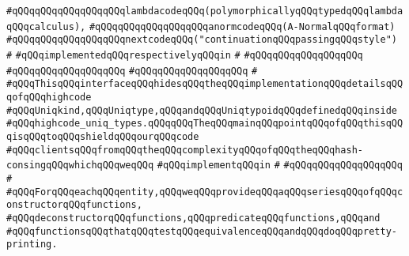 \verb|#qQQqqQQqqQQqqQQqqQQqlambdacodeqQQq(polymorphicallyqQQqtypedqQQqlambdaqQQqcalculus),|\newline
\verb|#qQQqqQQqqQQqqQQqqQQqanormcodeqQQq(A-NormalqQQqformat)|\newline
\verb|#qQQqqQQqqQQqqQQqqQQqnextcodeqQQq("continuationqQQqpassingqQQqstyle")|\newline
\verb|#|\newline
\verb|#qQQqimplementedqQQqrespectivelyqQQqin|\newline
\verb|#|\newline
\verb|#qQQqqQQqqQQqqQQqqQQq|\newline
\verb|#qQQqqQQqqQQqqQQqqQQq|\newline
\verb|#qQQqqQQqqQQqqQQqqQQq|\newline
\verb|#|\newline
\verb|#qQQqThisqQQqinterfaceqQQqhidesqQQqtheqQQqimplementationqQQqdetailsqQQqofqQQqhighcode|\newline
\verb|#qQQqUniqkind,qQQqUniqtype,qQQqandqQQqUniqtypoidqQQqdefinedqQQqinside|\newline
\verb|#qQQqhighcode_uniq_types.qQQqqQQqTheqQQqmainqQQqpointqQQqofqQQqthisqQQqisqQQqtoqQQqshieldqQQqourqQQqcode|\newline
\verb|#qQQqclientsqQQqfromqQQqtheqQQqcomplexityqQQqofqQQqtheqQQqhash-consingqQQqwhichqQQqweqQQq|\newline
\verb|#qQQqimplementqQQqin|\newline
\verb|#|\newline
\verb|#qQQqqQQqqQQqqQQqqQQq|\newline
\verb|#|\newline
\verb|#qQQqForqQQqeachqQQqentity,qQQqweqQQqprovideqQQqaqQQqseriesqQQqofqQQqconstructorqQQqfunctions,|\newline
\verb|#qQQqdeconstructorqQQqfunctions,qQQqpredicateqQQqfunctions,qQQqand|\newline
\verb|#qQQqfunctionsqQQqthatqQQqtestqQQqequivalenceqQQqandqQQqdoqQQqpretty-printing.|\newline
